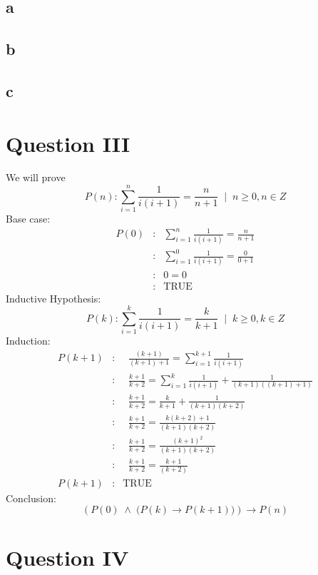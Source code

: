 \documentclass{article}
\begin{document}
\subsection*{a}

\subsection*{b}

\subsection*{c}

\section*{Question III}
We will prove
$$
P(n) \colon \sum^n_{i=1} \frac{1}{i(i+1)} = \frac{n}{n+1} \;\; \biggr | \;\; n \geq 0, n \in Z
$$
Base case:
\begin{eqnarray*}
P(0) &\colon& \sum^n_{i=1} \frac{1}{i(i+1)} = \frac{n}{n+1} \\
&\colon& \sum^0_{i=1} \frac{1}{i(i+1)} = \frac{0}{0+1} \\
&\colon& 0 = 0 \\
&\colon& \textrm{TRUE}
\end{eqnarray*}
Inductive Hypothesis:
$$
P(k) \colon \sum^k_{i=1} \frac{1}{i(i+1)} = \frac{k}{k+1} \;\; \biggr | \;\; k \geq 0, k \in Z
$$
Induction:
\begin{eqnarray*}
P(k+1) &\colon& \;\; \frac{(k+1)}{(k+1)+1} = \sum^{k+1}_{i=1} \frac{1}{i(i+1)}  \\
&\colon& \;\; \frac{k+1}{k+2} = \sum^k_{i=1} \frac{1}{i(i+1)} + \frac{1}{(k+1)((k+1)+1)} \\
&\colon& \;\; \frac{k+1}{k+2} = \frac{k}{k+1} + \frac{1}{(k+1)(k+2)} \\ 
&\colon& \;\; \frac{k+1}{k+2} = \frac{k(k+2) + 1}{(k+1)(k+2)} \\ 
&\colon& \;\; \frac{k+1}{k+2} = \frac{(k+1)^2}{(k+1)(k+2)} \\
&\colon& \;\; \frac{k+1}{k+2} = \frac{k+1}{(k+2)} \\
P(k+1) &\colon& \textrm{TRUE}
\end{eqnarray*}
Conclusion:
$$
\left (  P(0) \; \land \; \biggr ( P(k) \rightarrow P(k+1) \biggr ) \right ) \rightarrow P(n) 
$$

\section*{Question IV}
\end{document}
